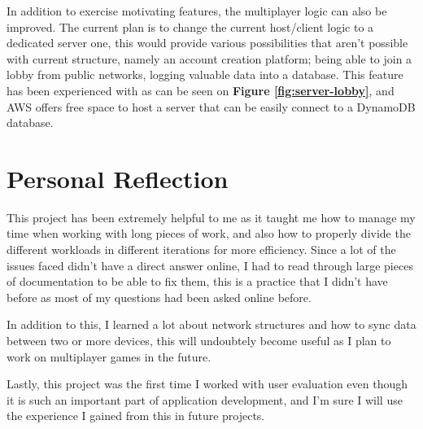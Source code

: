 \documentclass{dissertation}
\begin{document}
In addition to exercise motivating features, the multiplayer logic can also be improved. The current plan is to change the current host/client logic to a dedicated server one, this would provide various possibilities that aren't possible with current structure, namely an account creation platform; being able to join a lobby from public networks, logging valuable data into a database. This feature has been experienced with as can be seen on \textbf{Figure \ref{fig:server-lobby}}, and AWS offers free space to host a server that can be easily connect to a DynamoDB database.

\section{Personal Reflection}

This project has been extremely helpful to me as it taught me how to manage my time when working with long pieces of work, and also how to properly divide the different workloads in different iterations for more efficiency. Since a lot of the issues faced didn't have a direct answer online, I had to read through large pieces of documentation to be able to fix them, this is a practice that I didn't have before as most of my questions had been asked online before.

In addition to this, I learned a lot about network structures and how to sync data between two or more devices, this will undoubtely become useful as I plan to work on multiplayer games in the future.

Lastly, this project was the first time I worked with user evaluation even though it is such an important part of application development, and I'm sure I will use the experience I gained from this in future projects.
\end{document}
